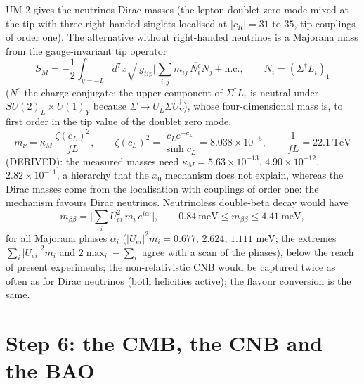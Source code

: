 \documentclass[
  10pt,
]{article}
\begin{document}
UM-2 gives the neutrinos Dirac masses (the lepton-doublet zero mode
mixed at the tip with three right-handed singlets localised at
\(|c_R| = 31\) to \(35\), tip couplings of order one). The alternative
without right-handed neutrinos is a Majorana mass from the
gauge-invariant tip operator
\[ S_M = -\frac12\int_{y=-L}d^7x\sqrt{\lvert g_{tip}\rvert}\sum_{i,j}m_{ij}\,\overline{N^c_i}N_j + \text{h.c.},\qquad N_i = (\Sigma^\dagger L_i)_1 \]
(\(N^c\) the charge conjugate; the upper component of
\(\Sigma^\dagger L_i\) is neutral under \(SU(2)_L\times U(1)_Y\) because
\(\Sigma \to U_L\Sigma U_Y^\dagger\)), whose four-dimensional mass is,
to first order in the tip value of the doublet zero mode,
\[ m_\nu = \kappa_M\,\frac{\zeta(c_L)^2}{fL},\qquad \zeta(c_L)^2 = \frac{c_Le^{-c_L}}{\sinh c_L} = 8.038\times10^{-5},\qquad \frac{1}{fL} = 22.1\ \text{TeV} \]
(DERIVED): the measured masses need \(\kappa_M = 5.63\times10^{-13}\),
\(4.90\times10^{-12}\), \(2.82\times10^{-11}\), a hierarchy that the
\(x_0\) mechanism does not explain, whereas the Dirac masses come from
the localisation with couplings of order one: the mechanism favours
Dirac neutrinos. Neutrinoless double-beta decay would have
\[ m_{\beta\beta} = \Big\lvert\sum_iU_{ei}^2\,m_i\,e^{i\alpha_i}\Big\rvert,\qquad 0.84\ \text{meV} \le m_{\beta\beta} \le 4.41\ \text{meV}, \]
for all Majorana phases \(\alpha_i\)
(\(\lvert U_{ei}\rvert^2m_i = 0.677\), \(2.624\), \(1.111\) meV; the
extremes \(\sum_i\lvert U_{ei}\rvert^2m_i\) and \(2\max_i - \sum_i\)
agree with a scan of the phases), below the reach of present
experiments; the non-relativistic CNB would be captured twice as often
as for Dirac neutrinos (both helicities active); the flavour conversion
is the same.

\hypertarget{step-6-the-cmb-the-cnb-and-the-bao}{%
\section{Step 6: the CMB, the CNB and the
BAO}\label{step-6-the-cmb-the-cnb-and-the-bao}}
\end{document}
